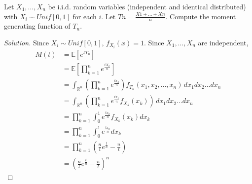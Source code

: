 \documentclass[addpoints, 11pt]{exam}
\newcommand*{\R}{\mathbb{R}}
\newcommand*{\E}{\mathds{E}}
\newenvironment{question}[1]{\smallskip\noindent\color{crimson}{\bf Question #1.}}{}
\begin{document}
\newpage

\begin{question}{8}
    Let $X_1, \dots , X_n$ be i.i.d. random variables (independent and identical distributed) with $X_i \sim Unif[0, 1]$ for each $i$. Let $Tn = \frac{X1 + \dots + Xn}{n}$. Compute the moment generating function of $T_n$.
\end{question}

\begin{proof}[Solution]
    Since $X_i \sim Unif[0,1]$, $f_{X_i}(x) = 1$. Since $X_1, \dots , X_n$ are independent,
    \begin{align*}
        M(t)
        &= \E[e^{tT_n}] \\
        &= \E\left[\prod_{k = 1}^n e^{\frac{tX_k}{n}}\right] \\
        &= \int_{\R^n} \left(\prod_{k = 1}^n e^{\frac{tx_k}{n}}\right) f_{T_n}(x_1, x_2, \dots, x_n) \, dx_1 dx_2 \dots dx_n \\
        &= \int_{\R^n} \left(\prod_{k = 1}^n e^{\frac{tx_k}{n}} f_{X_k}(x_k)\right) \, dx_1 dx_2 \dots dx_n \\
        &= \prod_{k = 1}^n \int^1_0 e^{\frac{tx_k}{n}} f_{X_k}(x_k) dx_k \\
        &= \prod_{k = 1}^n \int^1_0 e^{\frac{tx_k}{n}} dx_k \\
        &= \prod_{k = 1}^n \left(\frac{n}{t}e^{\frac{t}{n}} - \frac{n}{t}\right) \\
        &= \left(\frac{n}{t}e^{\frac{t}{n}} - \frac{n}{t}\right)^n
    \end{align*}
\end{proof}
\end{document}
